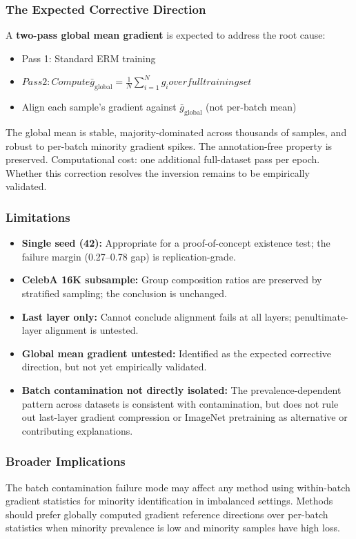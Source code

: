\subsubsection{The Expected Corrective Direction}

A \textbf{two-pass global mean gradient} is expected to address the root cause:
\begin{itemize}
\item Pass 1: Standard ERM training
\item $Pass 2: Compute \bar{g}_\text{global} = \frac{1}{N}\sum_{i=1}^N g_i over full training set$
\item Align each sample's gradient against $\bar{g}_\text{global}$ (not per-batch mean)
\end{itemize}

The global mean is stable, majority-dominated across thousands of samples, and robust to per-batch minority gradient spikes. The annotation-free property is preserved. Computational cost: one additional full-dataset pass per epoch. Whether this correction resolves the inversion remains to be empirically validated.

\subsubsection{Limitations}

\begin{itemize}
\item \textbf{Single seed (42):} Appropriate for a proof-of-concept existence test; the failure margin (0.27--0.78 gap) is replication-grade.
\item \textbf{CelebA 16K subsample:} Group composition ratios are preserved by stratified sampling; the conclusion is unchanged.
\item \textbf{Last layer only:} Cannot conclude alignment fails at all layers; penultimate-layer alignment is untested.
\item \textbf{Global mean gradient untested:} Identified as the expected corrective direction, but not yet empirically validated.
\item \textbf{Batch contamination not directly isolated:} The prevalence-dependent pattern across datasets is consistent with contamination, but does not rule out last-layer gradient compression or ImageNet pretraining as alternative or contributing explanations.
\end{itemize}

\subsubsection{Broader Implications}

The batch contamination failure mode may affect any method using within-batch gradient statistics for minority identification in imbalanced settings. Methods should prefer globally computed gradient reference directions over per-batch statistics when minority prevalence is low and minority samples have high loss.

